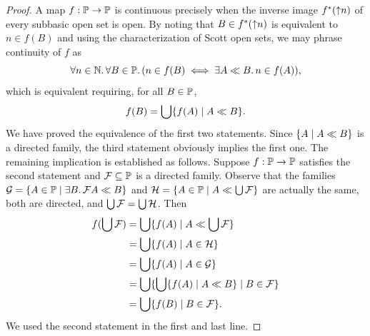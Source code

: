 \begin{proof}
  A map $f : \mathbb{P} \to \mathbb{P}$ is continuous precisely when the
  inverse image $f^{*}({\uparrow}n)$ of every subbasic open set is open.
  By noting that $B \in f^{*}({\uparrow}n)$ is equivalent to $n \in
  f(B)$ and using the characterization of Scott open sets, we may
  phrase continuity of $f$ as
  \begin{equation*}
    \forall n \in \mathbb{N} .\,{
      \forall B \in \mathbb{P} .\,
        (n \in f(B) \iff \exists A \ll B .\, n \in f(A))
    },
  \end{equation*}
  which is equivalent requiring, for all $B \in \mathbb{P}$,
  \begin{equation*}
    f(B) = \bigcup\nolimits \{f(A) \mid A \ll B\}.
  \end{equation*}
  We have proved the equivalence of the first two statements. Since
  $\{A \mid A \ll B\}$ is a directed family, the third statement
  obviously implies the first one. The remaining implication is
  established as follows. Suppose $f : \mathbb{P} \to \mathbb{P}$ satisfies
  the second statement and $\mathcal{F} \subseteq \mathbb{P}$ is a
  directed family. Observe that the families $\mathcal{G} = \{A \in
    \mathbb{P} \mid \exists B .\,{\mathcal{F}}{A \ll B}\}$ and $\mathcal{H}
  = \{A \in \mathbb{P} \mid A \ll \bigcup\nolimits \mathcal{F}\}$ are
  actually the same, both are directed, and $\bigcup\nolimits \mathcal{F} =
  \bigcup\nolimits \mathcal{H}$. Then
  \begin{align*}
    f (\bigcup\nolimits \mathcal{F}) &=
    \bigcup\nolimits \{f(A) \mid A \ll \bigcup\nolimits \mathcal{F}\} \\
    &= \bigcup\nolimits \{f(A) \mid A \in \mathcal{H}\} \\
    &= \bigcup\nolimits \{f(A) \mid A \in \mathcal{G}\} \\
    &= \bigcup\nolimits \{\bigcup\nolimits \{f(A) \mid A \ll B\} \mid B \in \mathcal{F}\} \\
    &= \bigcup\nolimits \{f(B) \mid B \in \mathcal{F}\}.
  \end{align*}
  We used the second statement in the first and last line.
\end{proof}

